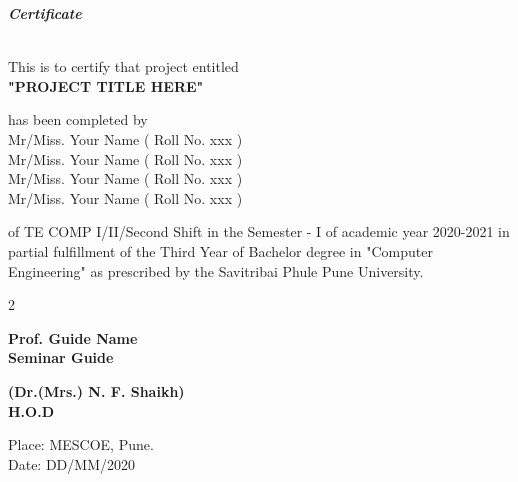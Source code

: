 \documentclass[a4paper, 12pt]{report}
\begin{document}
\begin{frontmatter}
\begin{titlepage}
\begin{center}
\begin{LARGE}
\textbf{\textit {Certificate}}\end{LARGE}\\[1.2cm]
This is to certify that project entitled\\[0.5cm]\large\textbf{ "PROJECT TITLE HERE"}
 
has been completed by \\
Mr/Miss. Your Name ( Roll No. xxx ) \\
Mr/Miss. Your Name ( Roll No. xxx ) \\
Mr/Miss. Your Name ( Roll No. xxx ) \\
Mr/Miss. Your Name ( Roll No. xxx ) \\
\end{center} 
of TE COMP I/II/Second Shift in the Semester - I of academic year 2020-2021 in partial fulfillment of the Third Year of Bachelor degree in "Computer Engineering" as prescribed by the Savitribai Phule Pune University.
\vspace{2cm}
\begin{multicols}{2}
\begin{center}
\textbf{Prof. Guide Name\\Seminar Guide}\hspace{5cm}\\
\end{center}
\begin{center}
\textbf{(Dr.(Mrs.) N. F. Shaikh)\\H.O.D}\\
\end{center}
\vspace{0.5cm}
\end{multicols}
Place: MESCOE, Pune.\\
Date: DD/MM/2020 \\
\vfill
\end{titlepage}

\pagebreak


\end{frontmatter}
\end{document}
